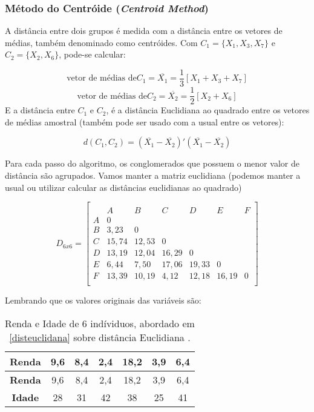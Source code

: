 \documentclass[
]{book}
\begin{document}
\hypertarget{muxe9todo-do-centruxf3ide-centroid-method}{%
\subsubsection{\texorpdfstring{Método do Centróide (\emph{Centroid Method})}{Método do Centróide (Centroid Method)}}\label{muxe9todo-do-centruxf3ide-centroid-method}}

A distância entre dois grupos é medida com a distância entre os vetores de médias, também denominado como centróides. Com \(C_1=\{X_1,X_3,X_7\}\) e \(C_2=\{X_2,X_6\}\), pode-se calcular:

\[\mbox{vetor de médias de} C_1=\overline{X_1}=\frac{1}{3}[X_1+X_3+X_7] \]
\[\mbox{vetor de médias de} C_2=\overline{X_2}=\frac{1}{2}[X_2+X_6]\]
E a distância entre \(C_1\) e \(C_2\), é a distância Euclidiana ao quadrado entre os vetores de médias amostral (também pode ser usado com a usual entre os vetores):

\begin{equation}
d(C_1,C_2)= (\overline{X_1}-\overline{X_2})'(\overline{X_1}-\overline{X_2})
 \label{eq:distcentroide}
\end{equation}

Para cada passo do algoritmo, os conglomerados que possuem o menor valor de distância são agrupados. Vamos manter a matriz euclidiana (podemos manter a usual ou utilizar calcular as distâncias euclidianas ao quadrado)

\[D_{6x6}=\begin{bmatrix}\\
 &A&B&C&D&E&F \\
 A&0&&&&&\\
 B&3,23&0&&&&\\
 C & 15,74& 12,53&0&&&\\
 D& 13,19& 12,04& 16,29&0&&\\
 E& 6,44& 7,50& 17,06& 19,33&0&\\
 F& 13,39& 10,19& 4,12& 12,18& 16,19&0 \\
\end{bmatrix}\]

Lembrando que os valores originais das variáveis são:

\begin{longtable}[]{@{}ccccccc@{}}
\caption{\label{tab:dadosrenda} Renda e Idade de 6 indíviduos, abordado em \ref{disteuclidana} sobre distância Euclidiana \citep{mingoti2007analise}.}\tabularnewline
\toprule
\textbf{Renda} & 9,6 & 8,4 & 2,4 & 18,2 & 3,9 & 6,4\tabularnewline
\midrule
\endfirsthead
\toprule
\textbf{Renda} & 9,6 & 8,4 & 2,4 & 18,2 & 3,9 & 6,4\tabularnewline
\midrule
\endhead
\textbf{Idade} & 28 & 31 & 42 & 38 & 25 & 41\tabularnewline
\bottomrule
\end{longtable}
\end{document}

